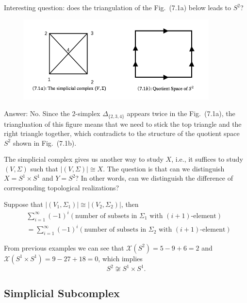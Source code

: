 Interesting question: does the triangulation of the Fig.~(7.1a) below leads to $S^2$? 
\begin{figure}[H]
\centering
\includegraphics[width=0.9\textwidth]{week7/p_15}
\end{figure}
Answer: No.
Since the 2-simplex $\Delta_{\{2,3,4\}}$ appears twice in the Fig.~(7.1a), the triangluation of this figure means that we need to stick the top triangle and the right triangle together, which contradicts to the structure of the quotient space $S^2$ shown in Fig.~(7.1b).


The simplicial complex gives us another way to study $X$, i.e., it suffices to study $(V,\Sigma)$ such that $|(V,\Sigma)|\cong X$.
The question is that can we distinguish $X=S^1\times S^1$ and $Y=S^2$?
In other words, can we distinguish the difference of corresponding topological realizations? 

\begin{theorem}
Suppose that $|(V_1,\Sigma_1)|\cong|(V_2,\Sigma_2)|$, then 
\begin{align*}
&\sum_{i=1}^\infty(-1)^i\left(\text{number of subsets in $\Sigma_1$ with $(i+1)$-element}\right)\\
&=
\sum_{i=1}^\infty(-1)^i\left(\text{number of subsets in $\Sigma_2$ with $(i+1)$-element}\right)
\end{align*}
\end{theorem}

From previous examples we can see that $\mathcal{X}(S^2) = 5-9+6=2$ and $\mathcal{X}(S^1\times S^1) = 9-27+18=0$, which implies
\[
S^2\not\cong S^1\times S^1.
\]

\subsection{Simplicial Subcomplex}

